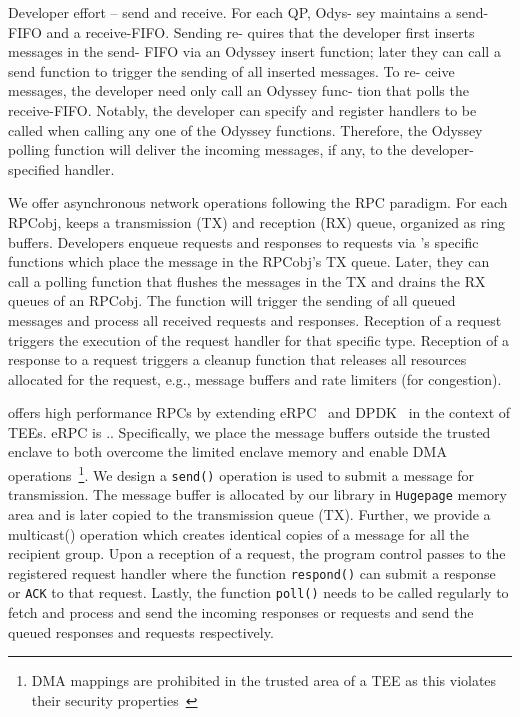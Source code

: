 Developer effort – send and receive. For each QP, Odys-
sey maintains a send-FIFO and a receive-FIFO. Sending re-
quires that the developer first inserts messages in the send-
FIFO via an Odyssey insert function; later they can call a send
function to trigger the sending of all inserted messages. To re-
ceive messages, the developer need only call an Odyssey func-
tion that polls the receive-FIFO. Notably, the developer can
specify and register handlers to be called when calling any
one of the Odyssey functions. Therefore, the Odyssey polling
function will deliver the incoming messages, if any, to the
developer-specified handler.
\fi





We offer asynchronous network operations following the RPC paradigm. For each RPCobj, \projecttitle{} keeps a transmission (TX) and reception (RX) queue, organized as ring buffers. Developers enqueue requests and responses to requests via \projecttitle{}'s specific functions which place the message in the RPCobj's TX queue. Later, they can call a polling function that flushes the messages in the TX and drains the RX queues of an RPCobj. The function will trigger the sending of all queued messages and process all received requests and responses. Reception of a request triggers the execution of the request handler for that specific type. Reception of a response to a request triggers a cleanup function that releases all resources allocated for the request, e.g., message buffers and rate limiters (for congestion). %

\projecttitle{} offers high performance RPCs by extending eRPC~\cite{erpc} and DPDK~\cite{dpdk} in the context of TEEs. eRPC is .. Specifically, we place the message buffers outside the trusted enclave to both overcome the limited enclave memory and enable DMA operations~\footnote{DMA mappings are prohibited in the trusted area of a TEE as this violates their security properties~\cite{intel-sgx}}. We design a \texttt{send()} operation is used to submit a message for transmission. The message buffer is allocated by our library in \texttt{Hugepage} memory area and is later copied to the transmission queue (TX). Further, we provide a multicast() operation which creates identical copies of a message for all the recipient group.    Upon a reception of a request, the program control passes to the registered request handler where the function \texttt{respond()} can submit a response or \texttt{ACK} to that request. Lastly, the function \texttt{poll()} needs to be called regularly to fetch and process and send the incoming responses or requests and send the queued responses and requests respectively. 
\fi




